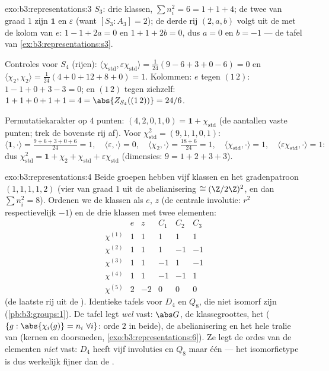 \begin{solution}{exo:b3:representations:3}
$S_3$: drie klassen, $\sum n_i^2 = 6 = 1 + 1 + 4$; de twee
 van graad $1$ zijn $\mathbf 1$ en $\varepsilon$ (want
$[S_3 : A_3] = 2$); de derde rij $(2, a, b)$ volgt uit de
 met de kolom van $e$: $1 - 1 + 2a = 0$ en $1
+ 1 + 2b = 0$, dus $a = 0$ en $b = -1$ --- de tafel van
\cref{ex:b3:representations:s3}.

Controles voor $S_4$ (rijen): $\langle\chi_{\mathrm{std}},
\varepsilon\chi_{\mathrm{std}}\rangle = \frac1{24}(9 - 6 + 3 + 0 -
6) = 0$ en $\langle\chi_2,\chi_2\rangle = \frac1{24}(4 + 0 + 12 +
8 + 0) = 1$. Kolommen: $e$ tegen $(1\,2)$: $1 - 1 + 0 + 3 - 3 =
0$; en $(1\,2)$ tegen zichzelf: $1 + 1 + 0 + 1 + 1 = 4 =
\abs{Z_{S_4}((1\,2))} = 24/6$.

Permutatiekarakter op $4$ punten: $(4, 2, 0, 1, 0) = \mathbf 1 +
\chi_{\mathrm{std}}$ (de aantallen vaste punten; trek de bovenste
rij af). Voor $\chi_{\mathrm{std}}^2 = (9, 1, 1, 0, 1)$:
\[
\langle\mathbf1,\cdot\rangle = \tfrac{9 + 6 + 3 + 0 + 6}{24} =
1,\quad
\langle\varepsilon,\cdot\rangle = 0,\quad
\langle\chi_2,\cdot\rangle = \tfrac{18 + 6}{24} = 1,\quad
\langle\chi_{\mathrm{std}},\cdot\rangle = 1,\quad
\langle\varepsilon\chi_{\mathrm{std}},\cdot\rangle = 1:
\]
dus $\chi_{\mathrm{std}}^2 = \mathbf 1 + \chi_2 +
\chi_{\mathrm{std}} + \varepsilon\chi_{\mathrm{std}}$ (dimensies:
$9 = 1 + 2 + 3 + 3$).
\end{solution}

\begin{solution}{exo:b3:representations:4}
Beide groepen hebben vijf klassen en het gradenpatroon
$(1,1,1,1,2)$ (vier  van graad $1$ uit de abelianisering
$\cong (\Z/2\Z)^2$, en dan $\sum n_i^2 = 8$). Ordenen we de
klassen als $e$, $z$ (de centrale involutie: $r^2$ respectievelijk
$-1$) en de drie klassen met twee elementen:
\[
\begin{array}{c|ccccc}
& e & z & C_1 & C_2 & C_3\\
\hline
\chi^{(1)} & 1 & 1 & 1 & 1 & 1\\
\chi^{(2)} & 1 & 1 & 1 & -1 & -1\\
\chi^{(3)} & 1 & 1 & -1 & 1 & -1\\
\chi^{(4)} & 1 & 1 & -1 & -1 & 1\\
\chi^{(5)} & 2 & -2 & 0 & 0 & 0
\end{array}
\]
(de laatste rij uit de ). Identieke tafels
voor $D_4$ en $Q_8$, die niet isomorf zijn
(\cref{pb:b3:groups:1}). De tafel legt \emph{wel} vast: $\abs G$,
de klassegroottes, het  ($\{g : \abs{\chi_i(g)} = n_i\
\forall i\}$: orde $2$ in beide), de abelianisering en het hele
tralie van  (kernen en doorsneden,
\cref{exo:b3:representations:6}). Ze legt de ordes van de
elementen \emph{niet} vast: $D_4$ heeft vijf involuties en $Q_8$
maar één --- het isomorfietype is dus werkelijk fijner dan de
.
\end{solution}

